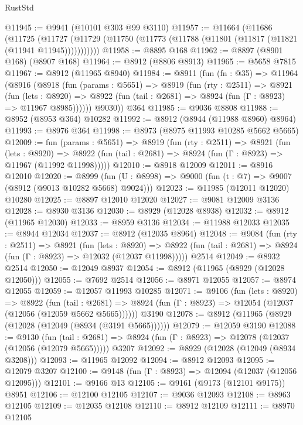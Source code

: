 \begin{lexlean}{RustStd}
\begin{coremodule}
@11945 := @9941 (@10101 @303 @99 @3110)
@11957 := @11664
    (@11686
      (@11725
        (@11727 (@11729 (@11750 (@11773 (@11788 (@11801 (@11817 (@11821 (@11941 @11945)))))))))))
@11958 := @8895 @168
@11962 := @8897 (@8901 @168) (@8907 @168)
@11964 := @8912 (@8806 @8913)
@11965 := @5658 @7815
@11967 := @8912 (@11965 @8940)
@11984 := @8911
    (fun (fn : @35) =>
    @11964
      (@8916
        (@8918
          (fun (params : @5651) =>
          @8919
            (fun (rty : @2511) =>
            @8921
              (fun (lets : @8920) =>
              @8922 (fun (tail : @2681) => @8924 (fun (Γ : @8923) => @11967 @8985))))))
        @9030))
    @364
@11985 := @9036 @8808
@11988 := @8952 (@8953 @364) @10282
@11992 := @8912 (@8944 (@11988 @8960) @8964)
@11993 := @8976 @364
@11998 := @8973 (@8975 @11993 @10285 @5662 @5665)
@12009 := fun (params : @5651) =>
  @8919
    (fun (rty : @2511) =>
    @8921
      (fun (lets : @8920) =>
      @8922 (fun (tail : @2681) => @8924 (fun (Γ : @8923) => @11967 (@11992 @11998)))))
@12010 := @8918 @12009
@12011 := @8916 @12010
@12020 := @8999
    (fun (U : @8998) => @9000 (fun (t : @7) => @9007 (@8912 (@9013 @10282 @5668) @9024)))
@12023 := @11985 (@12011 @12020) @10280
@12025 := @8897 @12010 @12020
@12027 := @9081 @12009 @3136
@12028 := @8930 @3136
@12030 := @8929 (@12028 @8938)
@12032 := @8912 (@11965 @12030)
@12033 := @8959 @3136
@12034 := @11988 @12033
@12035 := @8944 @12034
@12037 := @8912 (@12035 @8964)
@12048 := @9084
    (fun (rty : @2511) =>
    @8921
      (fun (lets : @8920) =>
      @8922 (fun (tail : @2681) => @8924 (fun (Γ : @8923) => @12032 (@12037 @11998)))))
    @2514
@12049 := @8932 @2514
@12050 := @12049 @8937
@12054 := @8912 (@11965 (@8929 (@12028 @12050)))
@12055 := @7692 @2514
@12056 := @8971 @12055
@12057 := @8974 @12055
@12059 := @12057 @11993 @10285
@12071 := @9106
    (fun (lets : @8920) =>
    @8922
      (fun (tail : @2681) =>
      @8924 (fun (Γ : @8923) => @12054 (@12037 (@12056 (@12059 @5662 @5665))))))
    @3190
@12078 := @8912 (@11965 (@8929 (@12028 (@12049 (@8934 (@3191 @5665))))))
@12079 := @12059 @3190
@12088 := @9130
    (fun (tail : @2681) => @8924 (fun (Γ : @8923) => @12078 (@12037 (@12056 (@12079 @5665)))))
    @3207
@12092 := @8929 (@12028 (@12049 (@8934 @3208)))
@12093 := @11965 @12092
@12094 := @8912 @12093
@12095 := @12079 @3207
@12100 := @9148 (fun (Γ : @8923) => @12094 (@12037 (@12056 @12095)))
@12101 := @9166 @13
@12105 := @9161 (@9173 (@12101 @9175)) @8951
@12106 := @12100 @12105
@12107 := @9036 @12093
@12108 := @8963 @12105
@12109 := @12035 @12108
@12110 := @8912 @12109
@12111 := @8970 @12105

\end{coremodule}
\end{lexlean}
